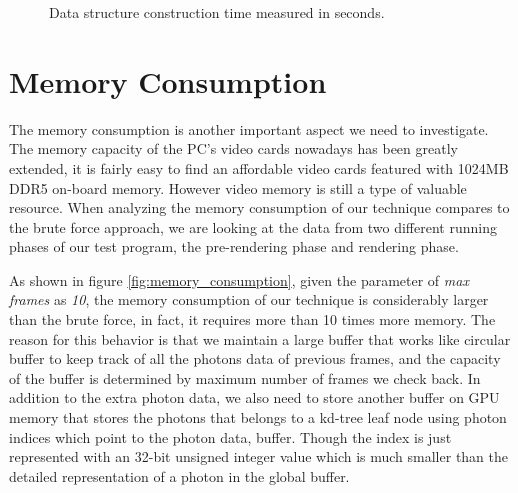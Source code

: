 \begin{figure}[ftp] 
    \centering 
    \renewcommand{\thefigure}{\thechapter.\arabic{figure}}
    \caption[Data construction time performance]{Data structure construction time measured in seconds. }
    \label{fig:construction_time} 
\end{figure} 

\section{Memory Consumption} 

The memory consumption is another important aspect we need to investigate. The memory capacity of the PC's video cards nowadays has been greatly extended, it is fairly easy to find an affordable video cards featured with 1024MB DDR5 on-board memory. However video memory is still a type of valuable resource. When analyzing the memory consumption of our technique compares to the brute force approach, we are looking at the data from two different running phases of our test program, the pre-rendering phase and rendering phase. 

As shown in figure \ref{fig:memory_consumption}, given the parameter of \emph{max frames} as \emph{10}, the memory consumption of our technique is considerably larger than the brute force, in fact, it requires more than 10 times more memory. The reason for this behavior is that we maintain a large buffer that works like circular buffer to keep track of all the photons data of previous frames, and the capacity of the buffer is determined by maximum number of frames we check back. In addition to the extra photon data, we also need to store another buffer on GPU memory that stores the photons that belongs to a kd-tree leaf node using photon indices which point to the photon data, buffer. Though the index is just represented with an 32-bit unsigned integer value which is much smaller than the detailed representation of a photon in the global buffer. 

